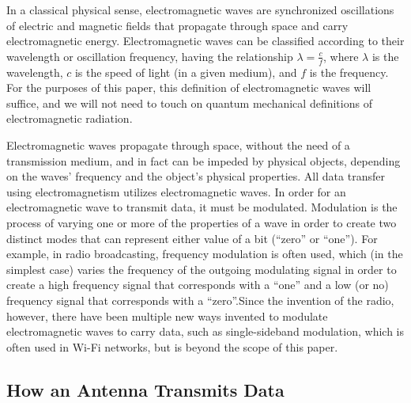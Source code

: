 \documentclass[11pt]{article}
\begin{document}
In a classical physical sense, electromagnetic waves are synchronized oscillations of electric and magnetic fields that propagate through space and carry electromagnetic energy. Electromagnetic waves can be classified according to their wavelength or oscillation frequency, having the relationship \begin{math} \lambda = \frac{c}{f} \end{math}, where \begin{math} \lambda \end{math} is the wavelength, \begin{math} c \end{math} is the speed of light (in a given medium), and \begin{math} f \end{math} is the frequency. For the purposes of this paper, this definition of electromagnetic waves will suffice, and we will not need to touch on quantum mechanical definitions of electromagnetic radiation. 

Electromagnetic waves propagate through space, without the need of a transmission medium, and in fact can be impeded by physical objects, depending on the waves’ frequency and the object's physical properties. 
All data transfer using electromagnetism utilizes electromagnetic waves. In order for an electromagnetic wave to transmit data, it must be modulated. Modulation is the process of varying one or more of the properties of a wave in order to create two distinct modes that can represent either value of a bit (“zero” or “one”). For example, in radio broadcasting, frequency modulation is often used, which (in the simplest case) varies the frequency of the outgoing modulating signal in order to create a high frequency signal that corresponds with a “one” and a low (or no) frequency signal that corresponds with a “zero”.Since the invention of the radio, however, there have been multiple new ways invented to modulate electromagnetic waves to carry data, such as single-sideband modulation, which is often used in Wi-Fi networks, but is beyond the scope of this paper.

\subsection{How an Antenna Transmits Data}
\end{document}
